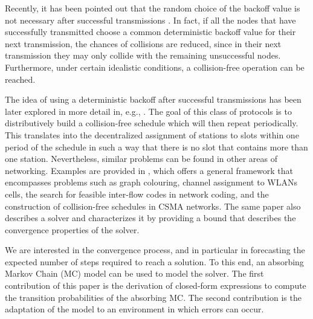 \documentclass[journal]{IEEEtran}
\newcommand{\AzCom}[1]{{\it \color{magenta} [#1]}}
\newcommand{\AzDel}[1]{{\color{red}{\{REMOVE: #1\}}}}
\begin{document}
Recently, it has been pointed out that the random choice of the backoff value is not necessary after successful transmissions \cite{barcelo2008lba}.
In fact, if all the nodes that have successfully transmitted choose a common deterministic backoff value for their next transmission, the chances of collisions are reduced, since in their next transmission they may only collide with the remaining unsuccessful nodes.
Furthermore, under certain idealistic conditions, a collision-free operation can be reached. 

The idea of using a deterministic backoff after successful transmissions has been later explored in more detail in, e.g., \cite{he2009srb,barcelo2011tcf,fang2011dlm,barcelo2010fcc}. 
The goal of this class of protocols is to distributively build a collision-free schedule which will then repeat periodically. This translates into the decentralized assignment of stations to slots within one period of the schedule in such a way that there is no slot that contains more than one station. 
Nevertheless, similar problems can be found in other areas of networking. 
Examples are provided in \cite{duffy2011dcs}, which offers a general framework that encompasses problems such as graph colouring, channel assignment to WLANs cells, the search for feasible inter-flow codes in network coding, and the construction of collision-free schedules in CSMA networks.
The same paper also describes a solver and characterizes it by providing a bound that describes the convergence properties of the solver.

We are interested in the convergence process, and in particular in forecasting the expected number of steps required to reach a solution. To this end, an absorbing Markov Chain (MC) model can be used to model the solver. The first contribution of this paper is the derivation of closed-form expressions to compute the transition probabilities of the absorbing MC.
The second contribution is the adaptation of the model to an environment in which errors can occur.


\end{document}
